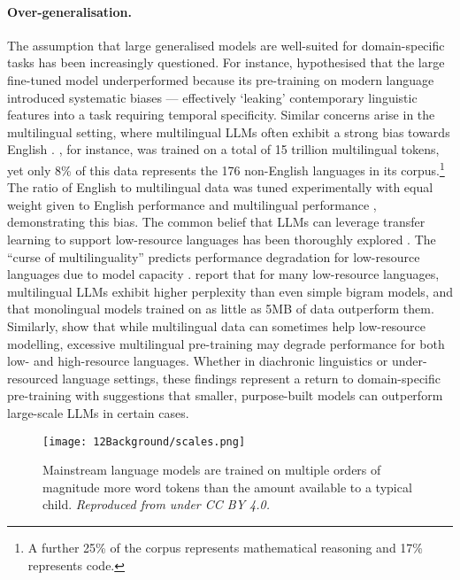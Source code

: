 \paragraph{Over-generalisation.} The assumption that large generalised models are well-suited for domain-specific tasks has been increasingly questioned. For instance, \citet{fittschen2025pretraininglanguagemodelsdiachronic} hypothesised that the large fine-tuned model underperformed because its pre-training on modern language introduced systematic biases --- effectively `leaking' contemporary linguistic features into a task requiring temporal specificity. Similar concerns arise in the multilingual setting, where multilingual LLMs often exhibit a strong bias towards English \citep{wendler-etal-2024-llamas}. , for instance, was trained on a total of 15 trillion multilingual tokens, yet only 8\% of this data represents the 176 non-English languages in its corpus.\footnote{A further 25\% of the corpus represents mathematical reasoning and 17\% represents code.} The ratio of English to multilingual data was tuned experimentally with equal weight given to English performance and multilingual performance \citep{grattafiori2024llama}, demonstrating this bias. The common belief that LLMs can leverage transfer learning to support low-resource languages has been thoroughly explored \citep{wu-dredze-2019-beto}. The ``curse of multilinguality'' predicts performance degradation for low-resource languages due to model capacity \citep{conneau2020unsupervised}. \citet{chang2024goldfish} report that for many low-resource languages, multilingual LLMs exhibit higher perplexity than even simple bigram models, and that monolingual models trained on as little as 5MB of data outperform them. Similarly, \citet{chang2024multilinguality} show that while multilingual data can sometimes help low-resource modelling, excessive multilingual pre-training may degrade performance for both low- and high-resource languages. Whether in diachronic linguistics or under-resourced language settings, these findings represent a return to domain-specific pre-training with suggestions that smaller, purpose-built models can outperform large-scale LLMs in certain cases.

\begin{figure}
    \centering
    \texttt{[image: 12Background/scales.png]}
    \caption{Mainstream language models are trained on multiple orders of magnitude more word tokens than the amount available to a typical child. \emph{Reproduced from \citet{wilcox2025} under CC BY 4.0.}}
    \label{fig:12-scales}
\end{figure}

